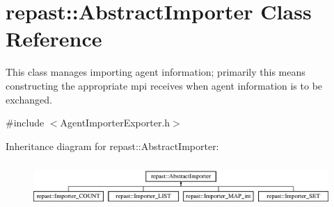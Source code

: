 \hypertarget{classrepast_1_1_abstract_importer}{\section{repast\-:\-:Abstract\-Importer Class Reference}
\label{classrepast_1_1_abstract_importer}
}


This class manages importing agent information; primarily this means constructing the appropriate mpi receives when agent information is to be exchanged.  




{\ttfamily \#include $<$Agent\-Importer\-Exporter.\-h$>$}

Inheritance diagram for repast\-:\-:Abstract\-Importer\-:\begin{figure}[H]
\begin{center}
\leavevmode
\includegraphics[height=1.728395cm]{classrepast_1_1_abstract_importer}
\end{center}
\end{figure}
